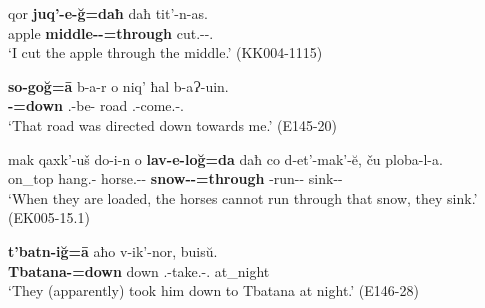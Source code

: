 \begin{exe}
	\ex\label{simplenp-ex51}
	\begin{xlist}
		
		
			\ex\label{simplenp-ex51a}
			\gll qor \textbf{juq'-e-\u{g}=daħ} daħ tit'-n-as. \\
			apple \textbf{middle-{\Obl}-{\Trans}=through} {\Pv} cut.{\Pfv}-{\Aor}-{\Fsg}.{\Erg} \\
			\trans `I cut the apple through the middle.'
			\hfill (KK004-1115)
		
		
		
			\ex\label{complexnp-ex51b}
			\gll \textbf{so-go\u{g}=\={a}} b-a-r o niq' ħal b-aɁ-uin. \\
			\textbf{{\Fsg}-{\Adtrans}=down} {\B}.{\Sg}-be-{\Imprf} {\Dist} road {\Pv} {\B}.{\Sg}-come.{\Pfv}-{\Ptcp}.{\Npst} \\
			\trans `That road was directed down towards me.'
			\hfill (E145-20)
		
		
		
			\ex\label{simplenp-ex51c}
			\gll mak qaxk'-uš do-i-n o \textbf{lav-e-lo\u{g}=da} daħ co d-et'-mak'-\u{e}, ču ploba-l-a.  \\
			on\_top hang.{\Pl}-{\Simul} horse.{\Obl}-{\Pl}-{\Dat} {\Dist} \textbf{snow-{\Obl}-{\Intertrans}=through}  {\Pv} {\Neg} {\D}-run-{\Pot}-{\Npst} {\Pv} sink-{\Intr}-{\Npst} \\
			\trans `When they are loaded, the horses cannot run through that snow, they sink.'
			\hfill (EK005-15.1)
		
		
		
			\ex\label{simplenp-ex51d}
			\gll \textbf{t'batn-i\u{g}=\={a}} aħo v-ik'-nor, buis\u{u}.   \\
			\textbf{Tbatana-{\Intrans}=down} down {\M}.{\Sg}-take.{\Anim}-{\Nw}.{\Rem} at\_night \\
			\trans `They (apparently) took him down to Tbatana at night.'
			\hfill (E146-28)
		
		
	\end{xlist}
\end{exe}


